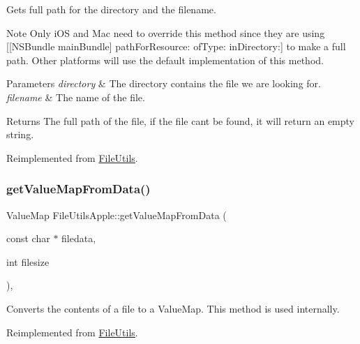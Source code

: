 Gets full path for the directory and the filename.

\begin{DoxyNote}{Note}
Only i\+OS and Mac need to override this method since they are using {\ttfamily \mbox{[}\mbox{[}N\+S\+Bundle main\+Bundle\mbox{]} path\+For\+Resource\+: of\+Type\+: in\+Directory\+:\mbox{]}} to make a full path. Other platforms will use the default implementation of this method. 
\end{DoxyNote}

\begin{DoxyParams}{Parameters}
{\em directory} & The directory contains the file we are looking for. \\
\hline
{\em filename} & The name of the file. \\
\hline
\end{DoxyParams}
\begin{DoxyReturn}{Returns}
The full path of the file, if the file can\textquotesingle{}t be found, it will return an empty string. 
\end{DoxyReturn}


Reimplemented from \hyperlink{classFileUtils_aa6bae4977b0a23b40f5c4dfea7aee3ff}{File\+Utils}.

\mbox{\label{classFileUtilsApple_aa692d9cc3bb1a5b913fd5ce5dee0a548}} 
\subsubsection{\texorpdfstring{get\+Value\+Map\+From\+Data()}{getValueMapFromData()}\hspace{0.1cm}{\footnotesize\ttfamily [1/2]}}
{\footnotesize\ttfamily Value\+Map File\+Utils\+Apple\+::get\+Value\+Map\+From\+Data (\begin{DoxyParamCaption}\item[{const char $\ast$}]{filedata,  }\item[{int}]{filesize }\end{DoxyParamCaption})\hspace{0.3cm}{\ttfamily [override]}, {\ttfamily [virtual]}}

Converts the contents of a file to a Value\+Map. This method is used internally. 

Reimplemented from \hyperlink{classFileUtils_a3b1cb7c770ba78d1d68c2da204e15a15}{File\+Utils}.

